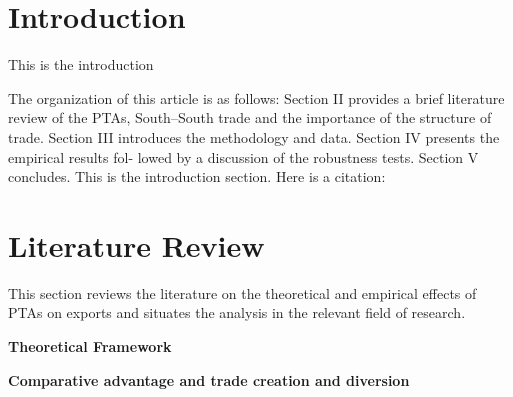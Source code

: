 \documentclass{article}%
\begin{document}
%
\newpage%
\listoffigures%
\newpage%
\listoftables%
\newpage%
%
\pagestyle{mainmatter}%
\section{Introduction}%
\label{sec:Introduction}%
This is the introduction

The organization of this article is as follows: Section II provides a
brief literature review of the PTAs, South--South trade and the
importance of the structure of trade. Section III introduces the
methodology and data. Section IV presents the empirical results fol-
lowed by a discussion of the robustness tests. Section V concludes.
%
This is the introduction section. Here is a citation: %
\cite{dahi_preferential_2013}

%
\section{Literature Review}%
\label{sec:LiteratureReview}%
This section reviews the literature on the theoretical and empirical
effects of PTAs on exports and situates the analysis in the relevant
field of research.

\textbf{Theoretical Framework}

\textbf{Comparative advantage and trade creation and diversion}
\end{document}
